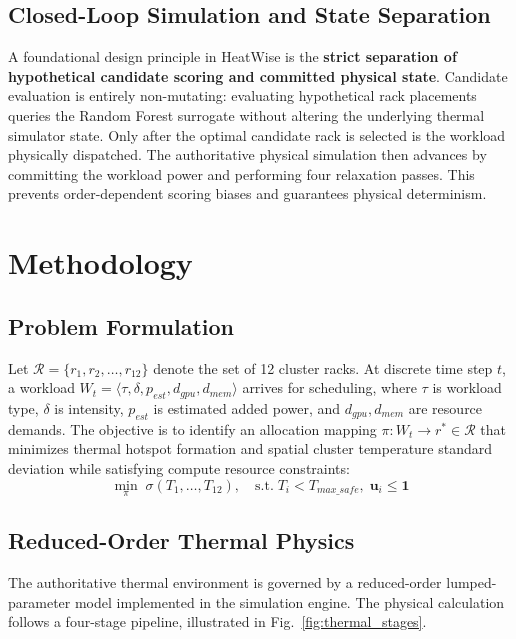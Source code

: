 \documentclass[conference,10pt]{IEEEtran}
\begin{document}
\subsection{Closed-Loop Simulation and State Separation}
A foundational design principle in HeatWise is the \textbf{strict separation of hypothetical candidate scoring and committed physical state}. Candidate evaluation is entirely non-mutating: evaluating hypothetical rack placements queries the Random Forest surrogate without altering the underlying thermal simulator state. Only after the optimal candidate rack is selected is the workload physically dispatched. The authoritative physical simulation then advances by committing the workload power and performing four relaxation passes. This prevents order-dependent scoring biases and guarantees physical determinism.

\section{Methodology}
\label{sec:methodology}

\subsection{Problem Formulation}
Let $\mathcal{R} = \{r_1, r_2, \dots, r_{12}\}$ denote the set of 12 cluster racks. At discrete time step $t$, a workload $W_t = \langle \tau, \delta, p_{est}, d_{gpu}, d_{mem} \rangle$ arrives for scheduling, where $\tau$ is workload type, $\delta$ is intensity, $p_{est}$ is estimated added power, and $d_{gpu}, d_{mem}$ are resource demands. The objective is to identify an allocation mapping $\pi: W_t \to r^* \in \mathcal{R}$ that minimizes thermal hotspot formation and spatial cluster temperature standard deviation while satisfying compute resource constraints:
\begin{equation}
\min_{\pi} \; \sigma(T_1, \dots, T_{12}), \quad \text{s.t.} \; T_i < T_{max\_safe}, \; \mathbf{u}_i \le \mathbf{1}
\end{equation}

\subsection{Reduced-Order Thermal Physics}
The authoritative thermal environment is governed by a reduced-order lumped-parameter model implemented in the simulation engine. The physical calculation follows a four-stage pipeline, illustrated in Fig.~\ref{fig:thermal_stages}.
\end{document}
